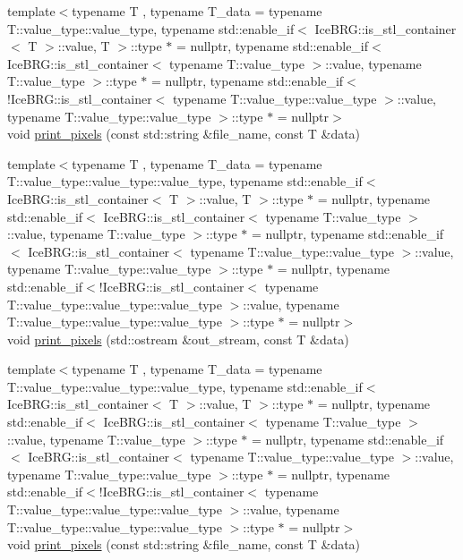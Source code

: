 \begin{DoxyCompactItemize}
\item 
{\footnotesize template$<$typename T , typename T\-\_\-data  = typename T\-::value\-\_\-type\-::value\-\_\-type, typename std\-::enable\-\_\-if$<$ Ice\-B\-R\-G\-::is\-\_\-stl\-\_\-container$<$ T $>$\-::value, T $>$\-::type $\ast$  = nullptr, typename std\-::enable\-\_\-if$<$ Ice\-B\-R\-G\-::is\-\_\-stl\-\_\-container$<$ typename T\-::value\-\_\-type $>$\-::value, typename T\-::value\-\_\-type $>$\-::type $\ast$  = nullptr, typename std\-::enable\-\_\-if$<$!\-Ice\-B\-R\-G\-::is\-\_\-stl\-\_\-container$<$ typename T\-::value\-\_\-type\-::value\-\_\-type $>$\-::value, typename T\-::value\-\_\-type\-::value\-\_\-type $>$\-::type $\ast$  = nullptr$>$ }\\void \hyperlink{namespaceIceBRG_a4f163d09ba4f5ab10a90f0ef68af2759}{print\-\_\-pixels} (const std\-::string \&file\-\_\-name, const T \&data)
\item 
{\footnotesize template$<$typename T , typename T\-\_\-data  = typename T\-::value\-\_\-type\-::value\-\_\-type\-::value\-\_\-type, typename std\-::enable\-\_\-if$<$ Ice\-B\-R\-G\-::is\-\_\-stl\-\_\-container$<$ T $>$\-::value, T $>$\-::type $\ast$  = nullptr, typename std\-::enable\-\_\-if$<$ Ice\-B\-R\-G\-::is\-\_\-stl\-\_\-container$<$ typename T\-::value\-\_\-type $>$\-::value, typename T\-::value\-\_\-type $>$\-::type $\ast$  = nullptr, typename std\-::enable\-\_\-if$<$ Ice\-B\-R\-G\-::is\-\_\-stl\-\_\-container$<$ typename T\-::value\-\_\-type\-::value\-\_\-type $>$\-::value, typename T\-::value\-\_\-type\-::value\-\_\-type $>$\-::type $\ast$  = nullptr, typename std\-::enable\-\_\-if$<$!\-Ice\-B\-R\-G\-::is\-\_\-stl\-\_\-container$<$ typename T\-::value\-\_\-type\-::value\-\_\-type\-::value\-\_\-type $>$\-::value, typename T\-::value\-\_\-type\-::value\-\_\-type\-::value\-\_\-type $>$\-::type $\ast$  = nullptr$>$ }\\void \hyperlink{namespaceIceBRG_a5c2f8ff1ebca7dea7058492da6c9cb81}{print\-\_\-pixels} (std\-::ostream \&out\-\_\-stream, const T \&data)
\item 
{\footnotesize template$<$typename T , typename T\-\_\-data  = typename T\-::value\-\_\-type\-::value\-\_\-type\-::value\-\_\-type, typename std\-::enable\-\_\-if$<$ Ice\-B\-R\-G\-::is\-\_\-stl\-\_\-container$<$ T $>$\-::value, T $>$\-::type $\ast$  = nullptr, typename std\-::enable\-\_\-if$<$ Ice\-B\-R\-G\-::is\-\_\-stl\-\_\-container$<$ typename T\-::value\-\_\-type $>$\-::value, typename T\-::value\-\_\-type $>$\-::type $\ast$  = nullptr, typename std\-::enable\-\_\-if$<$ Ice\-B\-R\-G\-::is\-\_\-stl\-\_\-container$<$ typename T\-::value\-\_\-type\-::value\-\_\-type $>$\-::value, typename T\-::value\-\_\-type\-::value\-\_\-type $>$\-::type $\ast$  = nullptr, typename std\-::enable\-\_\-if$<$!\-Ice\-B\-R\-G\-::is\-\_\-stl\-\_\-container$<$ typename T\-::value\-\_\-type\-::value\-\_\-type\-::value\-\_\-type $>$\-::value, typename T\-::value\-\_\-type\-::value\-\_\-type\-::value\-\_\-type $>$\-::type $\ast$  = nullptr$>$ }\\void \hyperlink{namespaceIceBRG_a44ae5278f1a504368ffedf3064c6b186}{print\-\_\-pixels} (const std\-::string \&file\-\_\-name, const T \&data)

\end{DoxyCompactItemize}
